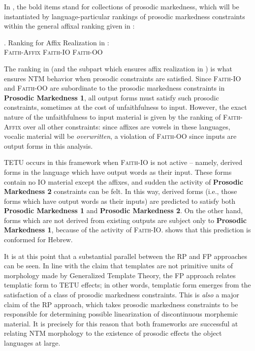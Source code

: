 \documentclass[12pt,twoside,letterpaper]{article}
\begin{document}
In \Last, the bold items stand for collections of prosodic markedness, which will be instantiated by language-particular rankings of prosodic markedness constraints within the general affixal ranking given in \Next:

\ex. Ranking for Affix Realization in \cite[p.193]{ussishkin05}:\\\textsc{Faith-Affix} \OTdom \textsc{Faith-IO} \OTdom \textsc{Faith-OO}

The ranking in \LLast (and the subpart which ensures affix realization in \Last) is what ensures NTM behavior when prosodic constraints are satisfied. Since \textsc{Faith-IO} and \textsc{Faith-OO} are subordinate to the prosodic markedness constraints in \textbf{Prosodic Markedness 1}, all output forms must satisfy such prosodic constraints, sometimes at the cost of unfaithfulness to input. However, the exact nature of the unfaithfulness to input material is given by the ranking of \textsc{Faith-Affix} over all other constraints: since affixes are vowels in these languages, vocalic material will be \emph{overwritten}, a violation of \textsc{Faith-OO} since inputs are output forms in this analysis.

TETU occurs in this framework when \textsc{Faith-IO} is not active -- namely, derived forms in the language which have output words as their input. These forms contain no \textsc{IO} material except the affixes, and sudden the activity of \textbf{Prosodic Markedness 2} constraints can be felt. In this way, derived forms (i.e., those forms which have output words as their inputs) are predicted to satisfy both \textbf{Prosodic Markedness 1} and \textbf{Prosodic Markedness 2}. On the other hand, forms which are not derived from existing outputs are subject only to \textbf{Prosodic Markedness 1}, because of the activity of \textsc{Faith-IO}. \cite{ussishkin05} shows that this prediction is conformed for Hebrew.

It is at this point that a substantial parallel between the RP and FP approaches can be seen. In line with the claim that templates are not primitive units of morphology made by Generalized Template Theory, the FP approach relates templatic form to TETU effects; in other words, templatic form emerges from the satisfaction of a class of prosodic markedness constraints. This is \emph{also} a major claim of the RP approach, which takes prosodic markedness constraints to be responsible for determining possible linearization of discontinuous morphemic material. It is precisely for this reason that both frameworks are successful at relating NTM morphology to the existence of prosodic effects the object languages at large.
\end{document}
